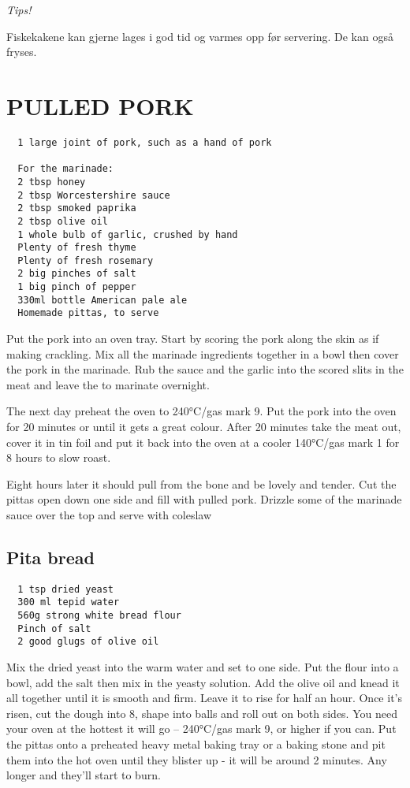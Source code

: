 \documentclass[11pt,]{article}
\begin{document}
\emph{Tips!}

Fiskekakene kan gjerne lages i god tid og varmes opp før servering. De
kan også fryses.

\clearpage

\section{PULLED PORK}\label{pulled-pork}

\begin{verbatim}
  1 large joint of pork, such as a hand of pork

  For the marinade:
  2 tbsp honey
  2 tbsp Worcestershire sauce
  2 tbsp smoked paprika
  2 tbsp olive oil
  1 whole bulb of garlic, crushed by hand
  Plenty of fresh thyme
  Plenty of fresh rosemary
  2 big pinches of salt
  1 big pinch of pepper
  330ml bottle American pale ale
  Homemade pittas, to serve
\end{verbatim}

Put the pork into an oven tray. Start by scoring the pork along the skin
as if making crackling. Mix all the marinade ingredients together in a
bowl then cover the pork in the marinade. Rub the sauce and the garlic
into the scored slits in the meat and leave the to marinate overnight.

The next day preheat the oven to 240°C/gas mark 9. Put the pork into the
oven for 20 minutes or until it gets a great colour. After 20 minutes
take the meat out, cover it in tin foil and put it back into the oven at
a cooler 140°C/gas mark 1 for 8 hours to slow roast.

Eight hours later it should pull from the bone and be lovely and tender.
Cut the pittas open down one side and fill with pulled pork. Drizzle
some of the marinade sauce over the top and serve with coleslaw

\subsection{Pita bread}\label{pita-bread}

\begin{verbatim}
  1 tsp dried yeast
  300 ml tepid water
  560g strong white bread flour
  Pinch of salt
  2 good glugs of olive oil
\end{verbatim}

Mix the dried yeast into the warm water and set to one side. Put the
flour into a bowl, add the salt then mix in the yeasty solution. Add the
olive oil and knead it all together until it is smooth and firm. Leave
it to rise for half an hour. Once it's risen, cut the dough into 8,
shape into balls and roll out on both sides. You need your oven at the
hottest it will go -- 240°C/gas mark 9, or higher if you can. Put the
pittas onto a preheated heavy metal baking tray or a baking stone and
pit them into the hot oven until they blister up - it will be around 2
minutes. Any longer and they'll start to burn.
\end{document}
